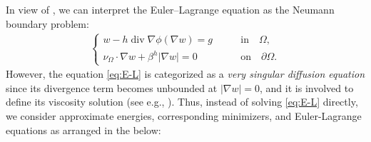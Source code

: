 \documentclass[11pt]{article}
\numberwithin{equation}{section}
\newcommand{\fix}[1]{\textcolor{red}{#1}}
\begin{document}
In view of \cite{EG24}, we can interpret the Euler--Lagrange equation as the Neumann boundary problem:
\begin{align}\label{eq:E-L}
\begin{cases}
w - h \operatorname{div} \nabla\phi(\nabla w)= g &\qquad \text{in}\quad \Omega, \\
\nu_{\Omega}\cdot\nabla w + \beta^h|\nabla w| = 0 &\qquad \text{on}\quad \partial \Omega.
\end{cases}
\end{align}
\noindent
However, the equation \eqref{eq:E-L} is categorized as a \textit{very singular diffusion equation} since its divergence term becomes unbounded at $|\nabla w| = 0$,
and it is involved to define its viscosity solution (see e.g.,  \cite{GGP14}).
Thus, instead of solving \eqref{eq:E-L} directly, we consider approximate energies, corresponding minimizers, and Euler-Lagrange equations as arranged in the below:%
\end{document}
